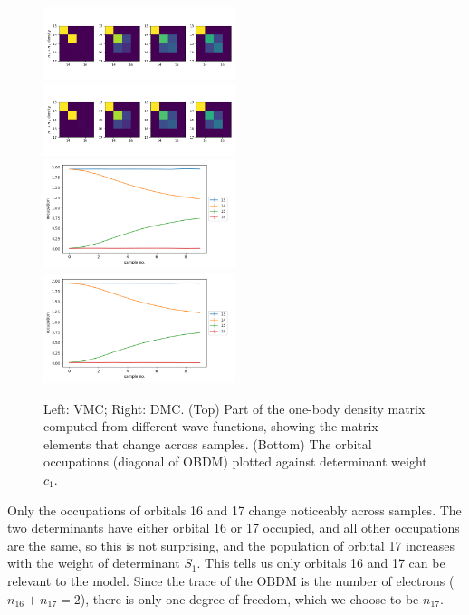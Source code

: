 \begin{figure}[h]
\includegraphics[width=0.5\textwidth]{images/vmc_2orb_obdm.png}
\includegraphics[width=0.5\textwidth]{images/dmc_2orb_obdm.png}
\includegraphics[width=0.5\textwidth]{images/vmc_2orb_occupations.png}
\includegraphics[width=0.5\textwidth]{images/dmc_2orb_occupations.png}
\caption{
Left: VMC; Right: DMC. 
(Top) Part of the one-body density matrix computed from different wave functions, showing the matrix elements that change across samples. 
(Bottom) The orbital occupations (diagonal of OBDM) plotted against determinant weight $c_1$.
}
\label{fig:obdm}
\end{figure}


Only the occupations of orbitals 16 and 17 change noticeably across samples.
The two determinants have either orbital 16 or 17 occupied, and all other occupations are the same, so this is not surprising, and the population of orbital 17 increases with the weight of determinant $S_1$.
This tells us only orbitals 16 and 17 can be relevant to the model.
Since the trace of the OBDM is the number of electrons ($n_{16}+n_{17}=2$), there is only one degree of freedom, which we choose to be $n_{17}$.

